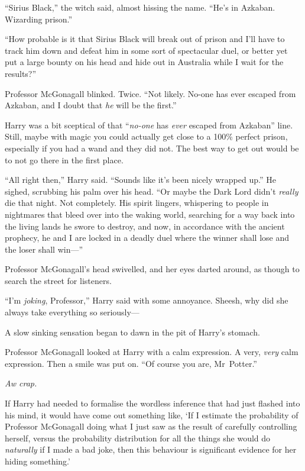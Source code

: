 “Sirius Black,” the witch said, almost hissing the name. “He’s in Azkaban. Wizarding prison.”

“How probable is it that Sirius Black will break out of prison and I’ll have to track him down and defeat him in some sort of spectacular duel, or better yet put a large bounty on his head and hide out in Australia while I wait for the results?”

Professor McGonagall blinked. Twice. “Not likely. No-one has ever escaped from Azkaban, and I doubt that \emph{he} will be the first.”

Harry was a bit sceptical of that “\emph{no-one} has \emph{ever} escaped from Azkaban” line. Still, maybe with magic you could actually get close to a 100\% perfect prison, especially if you had a wand and they did not. The best way to get out would be to not go there in the first place.

“All right then,” Harry said. “Sounds like it’s been nicely wrapped up.” He sighed, scrubbing his palm over his head. “Or maybe the Dark Lord didn’t \emph{really} die that night. Not completely. His spirit lingers, whispering to people in nightmares that bleed over into the waking world, searching for a way back into the living lands he swore to destroy, and now, in accordance with the ancient prophecy, he and I are locked in a deadly duel where the winner shall lose and the loser shall win—”

Professor McGonagall’s head swivelled, and her eyes darted around, as though to search the street for listeners.

“I’m \emph{joking}, Professor,” Harry said with some annoyance. Sheesh, why did she always take everything so seriously—

A slow sinking sensation began to dawn in the pit of Harry’s stomach.

Professor McGonagall looked at Harry with a calm expression. A very, \emph{very} calm expression. Then a smile was put on. “Of course you are, Mr~Potter.”

\emph{Aw crap.}

If Harry had needed to formalise the wordless inference that had just flashed into his mind, it would have come out something like, ‘If I estimate the probability of Professor McGonagall doing what I just saw as the result of carefully controlling herself, versus the probability distribution for all the things she would do \emph{naturally} if I made a bad joke, then this behaviour is significant evidence for her hiding something.’

